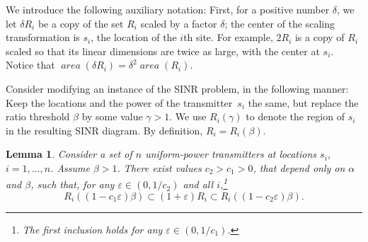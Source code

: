 \documentclass[11pt]{article}
\newtheorem{lemma}[theorem]{Lemma}
\theoremstyle{remark}
\DeclareMathOperator{\area}{\mathit{area}}
\let\eps\varepsilon
\begin{document}
We introduce the following auxiliary notation: First, for a positive number $\delta$, we let $\delta R_i$ be a copy of the set $R_i$ scaled by a factor $\delta$; the center of the scaling transformation is $s_i$, the location of the $i$th site.  For example, $2 R_i$ is a copy of $R_i$ scaled so that its linear dimensions are twice as large, with the center at $s_i$. Notice that $\area(\delta R_i) = \delta^2 \area(R_i)$. 

Consider modifying an instance of the SINR problem, in the following manner: Keep the locations and the power of the transmitter~$s_i$ the same, but replace the ratio threshold $\beta$ by some value $\gamma>1$.  We use $R_i(\gamma)$ to denote the region of $s_i$ in the resulting SINR diagram.  By definition, $R_i=R_i(\beta)$.

\begin{lemma}
  \label{lem:tedious}
  Consider a set of $n$ uniform-power transmitters at locations $s_i$, $i=1,\dots,n$. 
  Assume $\beta>1$. There exist values $c_2 > c_1 > 0$, that depend only on $\alpha$ and $\beta$, such that, for any $\eps \in (0,1/c_2)$ and all $i$,\footnote{The first inclusion holds for any $\eps \in (0,1/c_1)$.}
  \[
    R_i((1-c_1\eps)\beta) \subset (1+\eps)R_i \subset R_i((1-c_2\eps)\beta).
  \]
\end{lemma}
\end{document}
